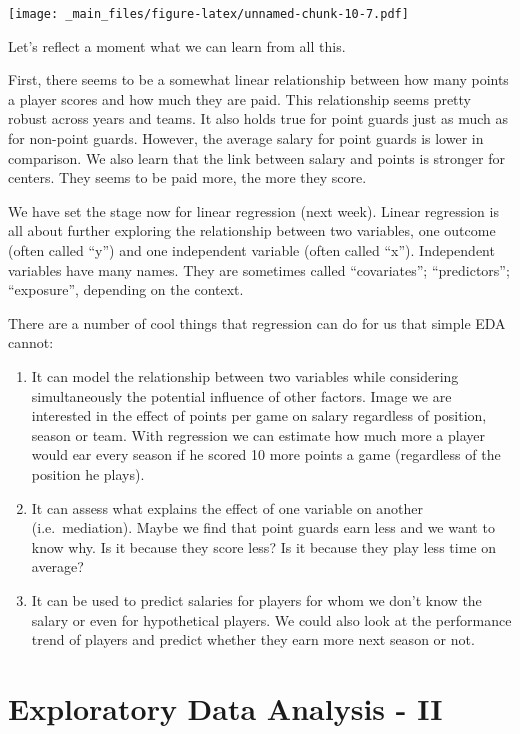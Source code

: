 \documentclass[
]{book}
\begin{document}
\texttt{[image: \_main\_files/figure-latex/unnamed-chunk-10-7.pdf]}

Let's reflect a moment what we can learn from all this.

First, there seems to be a somewhat linear relationship between how many points
a player scores and how much they are paid. This relationship seems pretty robust across years and teams. It also holds true for point guards just as much as for non-point guards. However, the average salary for point guards is lower in comparison. We also learn that the link between salary and points is stronger for centers. They seems to be paid more, the more they score.

We have set the stage now for linear regression (next week). Linear regression
is all about further exploring the relationship between two variables, one outcome (often called ``y'') and one independent variable (often called ``x''). Independent variables have many names. They are sometimes called ``covariates''; ``predictors''; ``exposure'', depending on the context.

There are a number of cool things that regression can do for us that simple EDA cannot:

\begin{enumerate}
\def\labelenumi{\arabic{enumi})}
\item
  It can model the relationship between two variables while considering simultaneously the potential influence of other factors. Image we are interested
  in the effect of points per game on salary regardless of position, season or team.
  With regression we can estimate how much more a player would ear every season
  if he scored 10 more points a game (regardless of the position he plays).
\item
  It can assess what explains the effect of one variable on another (i.e.~mediation). Maybe we find that point guards earn less and we want to know why. Is it because they score less? Is it because they play less time on average?
\item
  It can be used to predict salaries for players for whom we don't know the salary or even for hypothetical players. We could also look at the performance trend of players and predict whether they earn more next season or not.
\end{enumerate}

\hypertarget{eda-2}{%
\chapter{Exploratory Data Analysis - II}\label{eda-2}}
\end{document}
